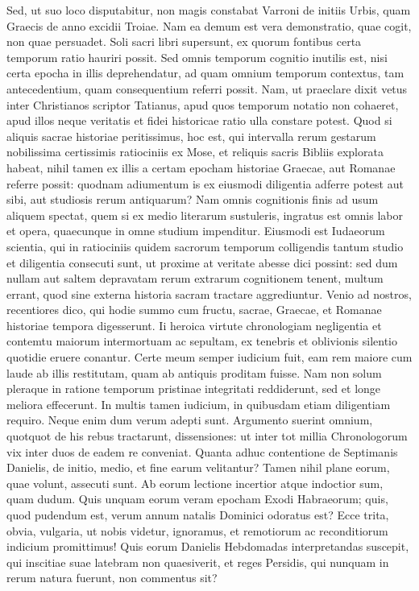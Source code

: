 Sed, ut suo loco disputabitur,
non magis constabat Varroni de initiis Urbis, quam Graecis de
anno excidii Troiae.
Nam ea demum est vera demonstratio, quae cogit,
non quae persuadet.
Soli sacri libri supersunt, ex quorum fontibus
certa temporum ratio hauriri possit.
Sed omnis temporum cognitio
inutilis est, nisi certa epocha in illis deprehendatur, ad quam omnium
temporum contextus, tam antecedentium, quam consequentium referri
possit.
Nam, ut praeclare dixit vetus inter Christianos scriptor
Tatianus, apud quos temporum notatio non cohaeret, apud illos neque
veritatis et fidei historicae ratio ulla constare potest.
Quod si aliquis
sacrae historiae peritissimus, hoc est, qui intervalla rerum gestarum
nobilissima certissimis ratiociniis ex Mose, et
 reliquis sacris Bibliis explorata
habeat, nihil tamen ex illis a certam epocham historiae Graecae,
aut Romanae referre possit: quodnam adiumentum is ex eiusmodi
diligentia adferre potest aut sibi, aut studiosis rerum antiquarum?
Nam omnis cognitionis finis ad usum aliquem spectat, quem si ex medio
literarum sustuleris, ingratus est omnis labor et opera, quaecunque
in omne studium impenditur.
Eiusmodi est Iudaeorum scientia, qui
in ratiociniis quidem sacrorum temporum colligendis tantum studio
et diligentia consecuti sunt, ut proxime at veritate abesse dici possint: sed
dum nullam aut saltem depravatam rerum extrarum cognitionem
tenent, multum errant, quod sine externa historia sacram tractare
aggrediuntur.
Venio ad nostros, recentiores dico, qui hodie summo
cum fructu, sacrae, Graecae, et Romanae historiae tempora digesserunt.
Ii heroica virtute chronologiam negligentia et contemtu maiorum
intermortuam ac sepultam, ex tenebris et oblivionis silentio quotidie
eruere conantur.
Certe meum semper iudicium fuit, eam rem maiore
cum laude ab illis restitutam, quam ab antiquis proditam fuisse.
Nam
non solum pleraque in ratione temporum pristinae integritati reddiderunt,
sed et longe meliora effecerunt.
In multis tamen iudicium, in quibusdam
etiam diligentiam requiro.
Neque enim dum verum adepti sunt.
Argumento suerint omnium, quotquot de his rebus tractarunt,
 dissensiones:
ut inter tot millia Chronologorum vix inter duos de eadem re
conveniat.
Quanta adhuc contentione de Septimanis Danielis, de initio,
medio, et fine earum velitantur?
Tamen nihil plane eorum, quae volunt,
assecuti sunt.
Ab eorum lectione incertior atque indoctior sum,
quam dudum.
Quis unquam eorum veram epocham Exodi Habraeorum;
quis, quod pudendum est, verum annum natalis Dominici odoratus
est?
Ecce trita, obvia, vulgaria, ut nobis videtur, ignoramus, et remotiorum
ac reconditiorum indicium promittimus!
Quis eorum Danielis
Hebdomadas interpretandas suscepit, qui inscitiae suae latebram
non quaesiverit, et reges Persidis, qui nunquam in rerum natura fuerunt,
non commentus sit?

